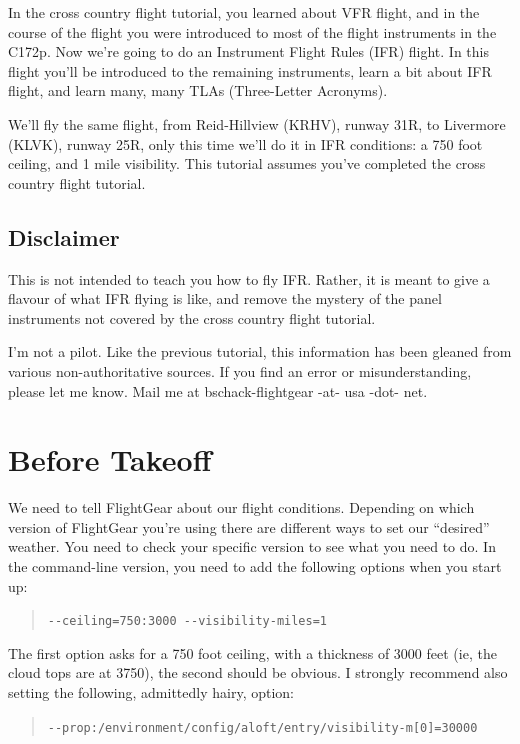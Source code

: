 In the cross country flight tutorial, you learned about VFR flight,
and in the course of the flight you were introduced to most of the
flight instruments in the C172p.  Now we're going to do an Instrument
Flight Rules (IFR) flight.  In this flight you'll be introduced to the
remaining instruments, learn a bit about IFR flight, and learn many,
many TLAs (Three-Letter Acronyms).

We'll fly the same flight, from Reid-Hillview (KRHV), runway 31R, to
Livermore (KLVK), runway 25R, only this time we'll do it in IFR
conditions: a 750 foot ceiling, and 1 mile visibility.  This tutorial
assumes you've completed the cross country flight tutorial.

\subsection{Disclaimer}

This is not intended to teach you how to fly IFR.  Rather, it is meant
to give a flavour of what IFR flying is like, and remove the mystery
of the panel instruments not covered by the cross country flight
tutorial.

I'm not a pilot.  Like the previous tutorial, this information has
been gleaned from various non-authoritative sources.  If you find an
error or misunderstanding, please let me know.  Mail me at
bschack-flightgear -at- usa -dot- net.

\section{Before Takeoff}

We need to tell FlightGear about our flight conditions.  Depending on
which version of FlightGear you're using there are different ways to
set our ``desired'' weather.  You need to check your specific version
to see what you need to do.  In the command-line version, you need to
add the following options when you start up:

\begin{quote}
  \verb|--ceiling=750:3000 --visibility-miles=1|
\end{quote}

The first option asks for a 750 foot ceiling, with a thickness of 3000
feet (ie, the cloud tops are at 3750), the second should be obvious.
I strongly recommend also setting the following, admittedly hairy,
option:

\begin{quote}
  \verb|--prop:/environment/config/aloft/entry/visibility-m[0]=30000|
\end{quote}

